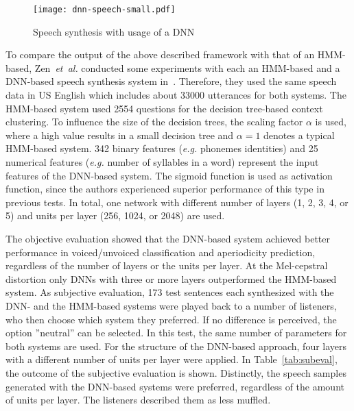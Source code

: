 \begin{figure}[h]
	\texttt{[image: dnn-speech-small.pdf]}
	\caption{Speech synthesis with usage of a \ac{DNN}~\cite{zen:deepstatistical}}
	\label{fig:dnnspeech}
\end{figure}

\noindent To compare the output of the above described framework with that of an \ac{HMM}-based, Zen~\textit{et~al.} conducted some experiments with each an \ac{HMM}-based and a \ac{DNN}-based speech synthesis system in~\cite{zen:deepstatistical}. Therefore, they used the same speech data in US English which includes about 33000 utterances for both systems. The \ac{HMM}-based system used 2554 questions for the decision tree-based context clustering. To influence the size of the decision trees, the scaling factor $\alpha$ is used, where a high value results in a small decision tree and $\alpha = 1$ denotes a typical \ac{HMM}-based system. 342 binary features (\textit{e.g.} phonemes identities) and 25 numerical features (\textit{e.g.} number of syllables in a word) represent the input features of the \ac{DNN}-based system. The sigmoid function is used as activation function, since the authors experienced superior performance of this type in previous tests. In total, one network with different number of layers (1, 2, 3, 4, or 5) and units per layer (256, 1024, or 2048) are used.

The objective evaluation showed that the \ac{DNN}-based system achieved better performance in voiced/unvoiced classification and aperiodicity prediction, regardless of the number of layers or the units per layer. At the Mel-cepstral distortion only \acp{DNN} with three or more layers outperformed the \ac{HMM}-based system. As subjective evaluation, 173 test sentences each synthesized with the \ac{DNN}- and the \ac{HMM}-based systems were played back to a number of listeners, who then choose which system they preferred. If no difference is perceived, the option ''neutral'' can be selected. In this test, the same number of parameters for both systems are used. For the structure of the \ac{DNN}-based approach, four layers with a different number of units per layer were applied. In Table~\ref{tab:subeval}, the outcome of the subjective evaluation is shown. Distinctly, the speech samples generated with the \ac{DNN}-based systems were preferred, regardless of the amount of units per layer. The listeners described them as less muffled.

